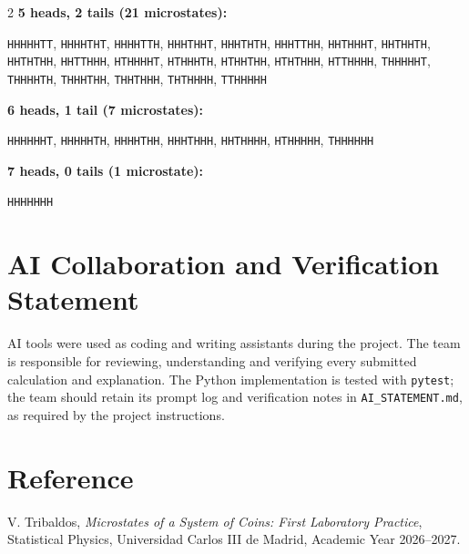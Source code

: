 \documentclass[10pt,a4paper]{article}
\begin{document}
\begin{multicols}{2}
\vspace{2pt}
\noindent\textbf{5 heads, 2 tails (21 microstates):}\par
\texttt{HHHHHTT}, \texttt{HHHHTHT}, \texttt{HHHHTTH}, \texttt{HHHTHHT}, \texttt{HHHTHTH}, \texttt{HHHTTHH}, \texttt{HHTHHHT}, \texttt{HHTHHTH}, \texttt{HHTHTHH}, \texttt{HHTTHHH}, \texttt{HTHHHHT}, \texttt{HTHHHTH}, \texttt{HTHHTHH}, \texttt{HTHTHHH}, \texttt{HTTHHHH}, \texttt{THHHHHT}, \texttt{THHHHTH}, \texttt{THHHTHH}, \texttt{THHTHHH}, \texttt{THTHHHH}, \texttt{TTHHHHH}\par
\vspace{2pt}
\noindent\textbf{6 heads, 1 tail (7 microstates):}\par
\texttt{HHHHHHT}, \texttt{HHHHHTH}, \texttt{HHHHTHH}, \texttt{HHHTHHH}, \texttt{HHTHHHH}, \texttt{HTHHHHH}, \texttt{THHHHHH}\par
\vspace{2pt}
\noindent\textbf{7 heads, 0 tails (1 microstate):}\par
\texttt{HHHHHHH}\par
\vspace{2pt}
\end{multicols}
\normalsize

\section{AI Collaboration and Verification Statement}
AI tools were used as coding and writing assistants during the project. The team is responsible for reviewing, understanding and verifying every submitted calculation and explanation. The Python implementation is tested with \texttt{pytest}; the team should retain its prompt log and verification notes in \texttt{AI\_STATEMENT.md}, as required by the project instructions.

\section{Reference}
V. Tribaldos, \emph{Microstates of a System of Coins: First Laboratory Practice}, Statistical Physics, Universidad Carlos III de Madrid, Academic Year 2026--2027.
\end{document}
